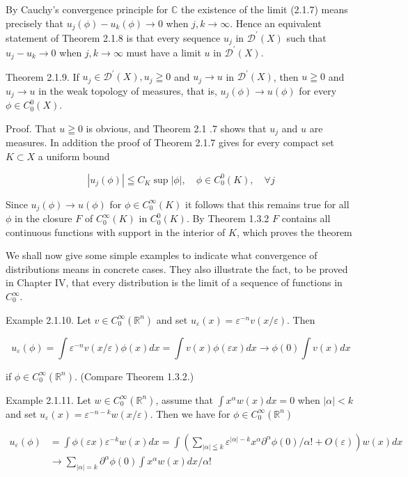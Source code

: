 By Cauchy's convergence principle for $\mathbb{C}$ the existence of the limit (2.1.7) means precisely that $u_{j}(\phi)-u_{k}(\phi) \rightarrow 0$ when $j, k \rightarrow \infty$. Hence an equivalent statement of Theorem 2.1.8 is that every sequence $u_{j}$ in $\mathscr{D}^{\prime}(X)$ such that $u_{j}-u_{k} \rightarrow 0$ when $j, k \rightarrow \infty$ must have a limit $u$ in $\mathscr{D}^{\prime}(X)$.

Theorem 2.1.9. If $u_{j} \in \mathscr{D}^{\prime}(X), u_{j} \geqq 0$ and $u_{j} \rightarrow u$ in $\mathscr{D}^{\prime}(X)$, then $u \geqq 0$ and $u_{j} \rightarrow u$ in the weak topology of measures, that is, $u_{j}(\phi) \rightarrow u(\phi)$ for every $\phi \in C_{0}^{0}(X)$.

Proof. That $u \geqq 0$ is obvious, and Theorem 2.1 .7 shows that $u_{j}$ and $u$ are measures. In addition the proof of Theorem 2.1.7 gives for every compact set $K \subset X$ a uniform bound

\[
\left|u_{j}(\phi)\right| \leqq C_{K} \sup |\phi|, \quad \phi \in C_{0}^{0}(K), \quad \forall j
\]

Since $u_{j}(\phi) \rightarrow u(\phi)$ for $\phi \in C_{0}^{\infty}(K)$ it follows that this remains true for all $\phi$ in the closure $F$ of $C_{0}^{\infty}(K)$ in $C_{0}^{0}(K)$. By Theorem 1.3.2 $F$ contains all continuous functions with support in the interior of $K$, which proves the theorem

We shall now give some simple examples to indicate what convergence of distributions means in concrete cases. They also illustrate the fact, to be proved in Chapter IV, that every distribution is the limit of a sequence of functions in $C_{0}^{\infty}$.

Example 2.1.10. Let $v \in C_{0}^{\infty}\left(\mathbb{R}^{n}\right)$ and set $u_{\varepsilon}(x)=\varepsilon^{-n} v(x / \varepsilon)$. Then

\[
u_{\varepsilon}(\phi)=\int \varepsilon^{-n} v(x / \varepsilon) \phi(x) d x=\int v(x) \phi(\varepsilon x) d x \rightarrow \phi(0) \int v(x) d x
\]

if $\phi \in C_{0}^{\infty}\left(\mathbb{R}^{n}\right)$. (Compare Theorem 1.3.2.)

Example 2.1.11. Let $w \in C_{0}^{\infty}\left(\mathbb{R}^{n}\right)$, assume that $\int x^{\alpha} w(x) d x=0$ when $|\alpha|<k$ and set $u_{\varepsilon}(x)=\varepsilon^{-n-k} w(x / \varepsilon)$. Then we have for $\phi \in C_{0}^{\infty}\left(\mathbb{R}^{n}\right)$

\[
\begin{aligned}
u_{\varepsilon}(\phi) & =\int \phi(\varepsilon x) \varepsilon^{-k} w(x) d x=\int\left(\sum_{|\alpha| \leqq k} \varepsilon^{|\alpha|-k} x^{\alpha} \partial^{\alpha} \phi(0) / \alpha !+O(\varepsilon)\right) w(x) d x \\
& \rightarrow \sum_{|\alpha|=k} \partial^{\alpha} \phi(0) \int x^{\alpha} w(x) d x / \alpha !
\end{aligned}
\]


